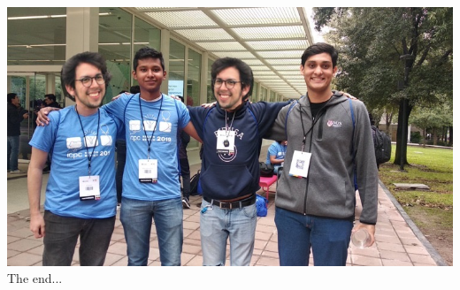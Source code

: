\documentclass{article}
\begin{document}
  

  

  \centering
  \includegraphics[width=17cm]{fullTeam.JPG} \\
  {\Huge The end...\\}
  
\end{document}
